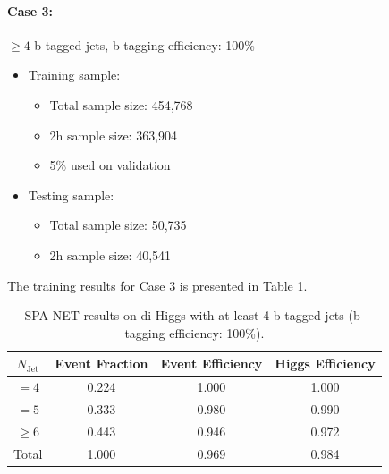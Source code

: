 \documentclass[12pt]{article}
\begin{document}
		\paragraph{Case 3:}$\ge 4$ b-tagged jets, b-tagging efficiency: 100\%
		\begin{itemize}
			\item Training sample:
			\begin{itemize}
				\item Total sample size: 454,768
				\item 2h sample size: 363,904
				\item 5\% used on validation
			\end{itemize}
			\item Testing sample: 
				\begin{itemize}
					\item Total sample size: 50,735
					\item 2h sample size: 40,541
				\end{itemize}
		\end{itemize}
		The training results for Case 3 is presented in Table \ref{tab:SPANet_4btag_100}.
		\begin{table}[htpb]
			\centering
			\caption{SPA-NET results on di-Higgs with at least 4 b-tagged jets (b-tagging efficiency: 100\%).}
			\label{tab:SPANet_4btag_100}
			\begin{tabular}{c|c|cc}
				$N_\text{Jet}$ & Event Fraction & Event Efficiency & Higgs Efficiency \\
				\hline
				$=4$	  &   0.224             &    1.000              &  1.000               \\
				$=5$	  &   0.333             &    0.980              &  0.990               \\
				$\ge 6$	  &   0.443             &    0.946              &  0.972               \\
				Total	  &   1.000             &    0.969              &  0.984               \\
			\end{tabular}
		\end{table}
\end{document}
